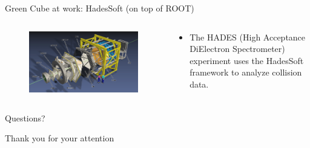 \begin{frame}[fragile]{Green Cube at work: HadesSoft (on top of ROOT)}
    \begin{columns}
        \begin{column}{0.6\textwidth}
            \begin{figure}
                \centering
                \includegraphics[width=\textwidth]{images/HADES_detectors.png}
            \end{figure}
        \end{column}
        \begin{column}{0.4\textwidth}
            \begin{itemize}
                \item The HADES (High Acceptance DiElectron Spectrometer) experiment uses the HadesSoft framework to analyze
                      collision data.
            \end{itemize}
        \end{column}
    \end{columns}
\end{frame}

\begin{frame}{}
    \centering
    \Large{Questions?}
\end{frame}


\begin{frame}{}
    \centering
    \Large{Thank you for your attention}
\end{frame}




